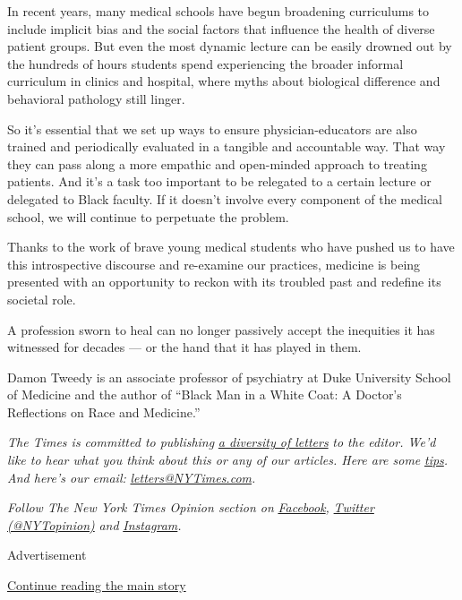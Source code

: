 In recent years, many medical schools have begun broadening curriculums
to include implicit bias and the social factors that influence the
health of diverse patient groups. But even the most dynamic lecture can
be easily drowned out by the hundreds of hours students spend
experiencing the broader informal curriculum in clinics and hospital,
where myths about biological difference and behavioral pathology still
linger.

So it's essential that we set up ways to ensure physician-educators are
also trained and periodically evaluated in a tangible and accountable
way. That way they can pass along a more empathic and open-minded
approach to treating patients. And it's a task too important to be
relegated to a certain lecture or delegated to Black faculty. If it
doesn't involve every component of the medical school, we will continue
to perpetuate the problem.

Thanks to the work of brave young medical students who have pushed us to
have this introspective discourse and re-examine our practices, medicine
is being presented with an opportunity to reckon with its troubled past
and redefine its societal role.

A profession sworn to heal can no longer passively accept the inequities
it has witnessed for decades --- or the hand that it has played in them.

Damon Tweedy is an associate professor of psychiatry at Duke University
School of Medicine and the author of ``Black Man in a White Coat: A
Doctor's Reflections on Race and Medicine.''

\emph{The Times is committed to publishing}
\href{https://www.nytimes3xbfgragh.onion/2019/01/31/opinion/letters/letters-to-editor-new-york-times-women.html}{\emph{a
diversity of letters}} \emph{to the editor. We'd like to hear what you
think about this or any of our articles. Here are some}
\href{https://help.nytimes3xbfgragh.onion/hc/en-us/articles/115014925288-How-to-submit-a-letter-to-the-editor}{\emph{tips}}\emph{.
And here's our email:}
\href{mailto:letters@NYTimes.com}{\emph{letters@NYTimes.com}}\emph{.}

\emph{Follow The New York Times Opinion section on}
\href{https://www.facebookcorewwwi.onion/nytopinion}{\emph{Facebook}}\emph{,}
\href{http://twitter.com/NYTOpinion}{\emph{Twitter (@NYTopinion)}}
\emph{and}
\href{https://www.instagram.com/nytopinion/}{\emph{Instagram}}\emph{.}

Advertisement

\protect\hyperlink{after-bottom}{Continue reading the main story}

